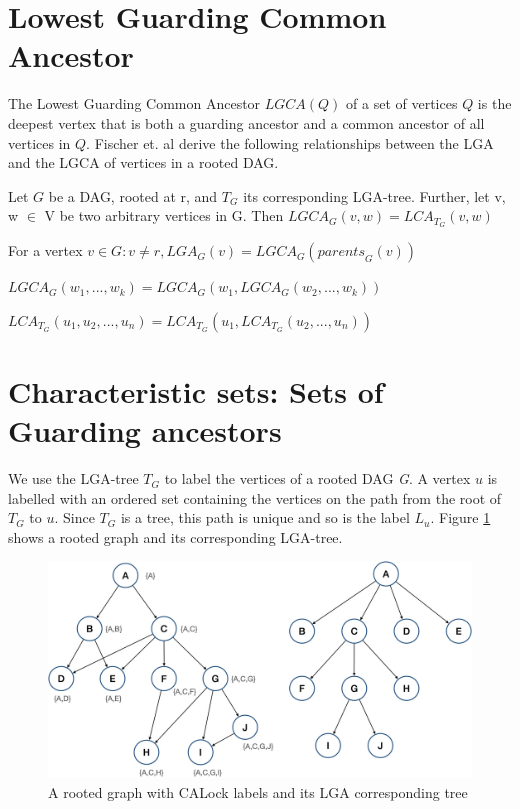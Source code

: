 \section{Lowest Guarding Common Ancestor} \label{LGCADefinitions}

The Lowest Guarding Common Ancestor $LGCA(Q)$ of a set of vertices $Q$ is the deepest vertex that is both a guarding ancestor and a common ancestor of all vertices in $Q$. Fischer et. al \cite{fischer2010new} derive the following relationships between the LGA and the LGCA of vertices in a rooted DAG.


\begin{lemma}\label{lscaislca}
	Let $G$ be a DAG, rooted at r, and $T_G$  its corresponding LGA-tree. Further, let v, w $\in$ V be two arbitrary vertices in G. Then $LGCA_G(v,w) = LCA_{T_G}(v,w)$
\end{lemma}



\begin{lemma}\label{lgaislgcaofparents}
		For a vertex $v \in G: v \neq r , LGA_G(v) = LGCA_G(\mathit{parents}_G(v))$
\end{lemma}


\begin{definition}\label{associativelgca}
		$LGCA_G (w_1, ... ,w_k) = LGCA_G (w_1, LGCA_G (w_2, ... ,w_k))$
\end{definition}

\begin{definition}\label{associativelca}
	$LCA_{T_G} (u_1, u_2,..., u_n) = LCA_{T_G} (u_1, LCA_{T_G} (u_2,...,u_n))$
\end{definition}

\section{Characteristic sets: Sets of Guarding ancestors}

We use the LGA-tree $T_G$ to label the vertices of a rooted DAG \emph{G}.
A vertex $u$ is labelled with an ordered set containing the vertices on the path from the root of $T_G$ to $u$. Since $T_G$ is a tree, this path is unique and so is the label $L_u$. Figure \ref{fig:LGATree} shows a rooted graph and its corresponding LGA-tree.

\begin{figure}
	\centering
	\captionsetup{justification=centering}
	\includegraphics[width=\textwidth]{figures/LGATree.png}
	\caption{A rooted graph with CALock labels and its LGA corresponding tree} \label{fig:LGATree}
\end{figure}

